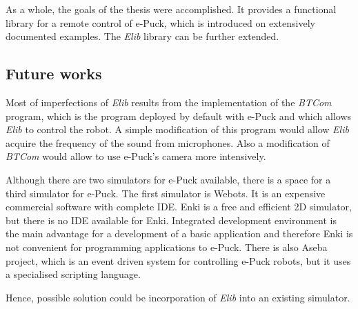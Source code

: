 	As a whole, the goals of the thesis were accomplished. It provides a functional library for
	a remote control of e-Puck, which is introduced on extensively documented examples.
	The {\it Elib} library can be further extended.

\subsection*{Future works}
	Most of imperfections of {\it Elib} results from the implementation 
        of the {\it BTCom} program, which is the program deployed by default with e-Puck 
        and which allows {\it Elib} to control the robot.
	A simple modification of this program would allow {\it Elib} acquire the frequency 
        of the sound from microphones.
	Also a modification of {\it BTCom} would allow to use e-Puck's camera more intensively.

	Although there are two simulators for e-Puck available, 
        there is a space for a third simulator for e-Puck.
	The first simulator is Webots. It is an expensive commercial software with complete IDE. 
	Enki is a free and efficient 2D simulator, but there is no IDE available for Enki. 
        Integrated development environment is the main advantage 
        for a development of a basic application and therefore Enki is not
	convenient for programming applications to e-Puck.
	There is also Aseba project, which is an event driven system for controlling e-Puck robots, 
	but it uses a specialised scripting language.

	Hence, possible solution could be incorporation of {\it Elib} into an existing simulator.
